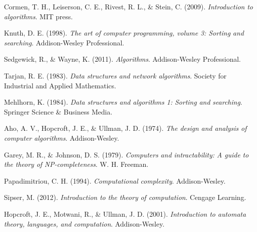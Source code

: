 \documentclass[12pt,a4paper]{article}
\begin{document}

\begin{thebibliography}{99}

Cormen, T. H., Leiserson, C. E., Rivest, R. L., \& Stein, C. (2009). \textit{Introduction to algorithms}. MIT press.

Knuth, D. E. (1998). \textit{The art of computer programming, volume 3: Sorting and searching}. Addison-Wesley Professional.

Sedgewick, R., \& Wayne, K. (2011). \textit{Algorithms}. Addison-Wesley Professional.

Tarjan, R. E. (1983). \textit{Data structures and network algorithms}. Society for Industrial and Applied Mathematics.

Mehlhorn, K. (1984). \textit{Data structures and algorithms 1: Sorting and searching}. Springer Science \& Business Media.

Aho, A. V., Hopcroft, J. E., \& Ullman, J. D. (1974). \textit{The design and analysis of computer algorithms}. Addison-Wesley.

Garey, M. R., \& Johnson, D. S. (1979). \textit{Computers and intractability: A guide to the theory of NP-completeness}. W. H. Freeman.

Papadimitriou, C. H. (1994). \textit{Computational complexity}. Addison-Wesley.

Sipser, M. (2012). \textit{Introduction to the theory of computation}. Cengage Learning.

Hopcroft, J. E., Motwani, R., \& Ullman, J. D. (2001). \textit{Introduction to automata theory, languages, and computation}. Addison-Wesley.

\end{thebibliography}
\end{document}
